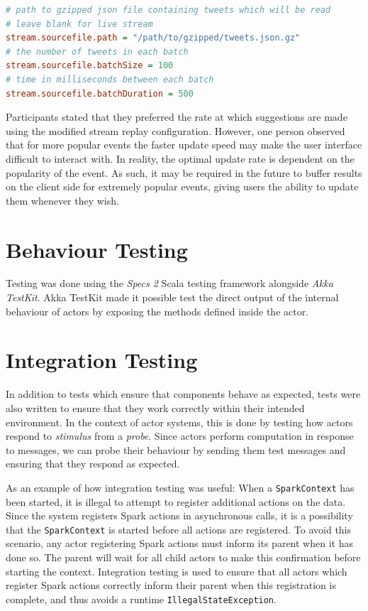 \documentclass{l4proj}
\newcommand{\code}[1]{\texttt{#1}}
\begin{document}
\begin{lstlisting}[caption=Configuration of the stream replay rate in application.conf,language=Ini]
# path to gzipped json file containing tweets which will be read
# leave blank for live stream
stream.sourcefile.path = "/path/to/gzipped/tweets.json.gz"
# the number of tweets in each batch
stream.sourcefile.batchSize = 100
# time in milliseconds between each batch
stream.sourcefile.batchDuration = 500
\end{lstlisting}

Participants stated that they preferred the rate at which suggestions are made using the modified stream replay configuration. However, one person observed that for more popular events the faster update speed may make the user interface difficult to interact with. In reality, the optimal update rate is dependent on the popularity of the event. As such, it may be required in the future to buffer results on the client side for extremely popular events, giving users the ability to update them whenever they wish.

\section{Behaviour Testing}

    Testing was done using the \textit{Specs 2} Scala testing framework alongside \textit{Akka TestKit}. Akka TestKit made it possible test the direct output of the internal behaviour of actors by exposing the methods defined inside the actor.
        
\section{Integration Testing}
    In addition to tests which ensure that components behave as expected, tests were also written to ensure that they work correctly within their intended environment. In the context of actor systems, this is done by testing how actors respond to \textit{stimulus} from a \textit{probe}. Since actors perform computation in response to messages, we can probe their behaviour by sending them test messages and ensuring that they respond as expected.
    
    As an example of how integration testing was useful: When a \code{SparkContext} has been started, it is illegal to attempt to register additional actions on the data. Since the system registers Spark actions in asynchronous calls, it is a possibility that the \code{SparkContext} is started before all actions are registered. To avoid this scenario, any actor registering Spark actions must inform its parent when it has done so. The parent will wait for all child actors to make this confirmation before starting the context. Integration testing is used to ensure that all actors which register Spark actions correctly inform their parent when this registration is complete, and thus avoids a runtime \code{IllegalStateException}.
\end{document}
